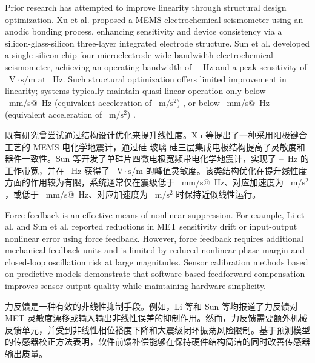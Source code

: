 \documentclass[sn-nature]{sn-jnl}
\newif\ifCNENEnglish
\newif\ifCNENBilingual
\newcommand{\CNEN}[2]{%
    \ifCNENBilingual
        #1%
        \if\relax\detokenize{#2}\relax\else\par #2\fi%
    \else
        \ifCNENEnglish
            #2%
        \else
            #1%
        \fi
    \fi
}
\begin{document}
\CNEN{既有研究曾尝试通过结构设计优化来提升线性度。Xu 等\cite{9481294}提出了一种采用阳极键合工艺的 MEMS 电化学地震计，通过硅-玻璃-硅三层集成电极结构提高了灵敏度和器件一致性。Sun 等\cite{sun_high-consistency_2017}开发了单硅片四微电极宽频带电化学地震计，实现了 \valXuBandwidthStart--\valXuBandwidthEnd~Hz 的工作带宽，并在 \valXuPeakSensitivityFreq~Hz 获得了 \valXuPeakSensitivity~$\text{V} \cdot \text{s}/\text{m}$ 的峰值灵敏度。该类结构优化在提升线性度方面的作用较为有限，系统通常仅在震级低于 \valXuLinearLimitMm~mm/s@\valLinearLimitRefFreq~Hz、对应加速度为 \valXuLinearLimitAcc~$\text{m}/\text{s}^2$\cite{9481294}，或低于 \valSunLinearLimitMm~mm/s@\valLinearLimitRefFreq~Hz、对应加速度为 \valSunLinearLimitAcc~$\text{m}/\text{s}^2$\cite{sun_high-consistency_2017} 时保持近似线性运行。}{Prior research has attempted to improve linearity through structural design optimization. Xu et al. \cite{9481294} proposed a MEMS electrochemical seismometer using an anodic bonding process, enhancing sensitivity and device consistency via a silicon-glass-silicon three-layer integrated electrode structure. Sun et al. \cite{sun_high-consistency_2017} developed a single-silicon-chip four-microelectrode wide-bandwidth electrochemical seismometer, achieving an operating bandwidth of \valXuBandwidthStart--\valXuBandwidthEnd~Hz and a peak sensitivity of \valXuPeakSensitivity~$\text{V} \cdot \text{s}/\text{m}$ at \valXuPeakSensitivityFreq~Hz. Such structural optimization offers limited improvement in linearity; systems typically maintain quasi-linear operation only below \valXuLinearLimitMm~mm/s@\valLinearLimitRefFreq~Hz (equivalent acceleration of \valXuLinearLimitAcc~$\text{m}/\text{s}^2$) \cite{9481294}, or below \valSunLinearLimitMm~mm/s@\valLinearLimitRefFreq~Hz (equivalent acceleration of \valSunLinearLimitAcc~$\text{m}/\text{s}^2$) \cite{sun_high-consistency_2017}.%
}

\CNEN{力反馈是一种有效的非线性抑制手段。例如，Li 等\cite{li_electrochemical_2017}和 Sun 等\cite{WOS:000408118700046}均报道了力反馈对 MET 灵敏度漂移或输入输出非线性误差的抑制作用。然而，力反馈需要额外机械反馈单元，并受到非线性相位裕度下降和大震级闭环振荡风险限制。基于预测模型的传感器校正方法\cite{WOS:001409548400009}表明，软件前馈补偿能够在保持硬件结构简洁的同时改善传感器输出质量。}{Force feedback is an effective means of nonlinear suppression. For example, Li et al. \cite{li_electrochemical_2017} and Sun et al. \cite{WOS:000408118700046} reported reductions in MET sensitivity drift or input-output nonlinear error using force feedback. However, force feedback requires additional mechanical feedback units and is limited by reduced nonlinear phase margin and closed-loop oscillation risk at large magnitudes. Sensor calibration methods based on predictive models \cite{WOS:001409548400009} demonstrate that software-based feedforward compensation improves sensor output quality while maintaining hardware simplicity.%
}
\end{document}
